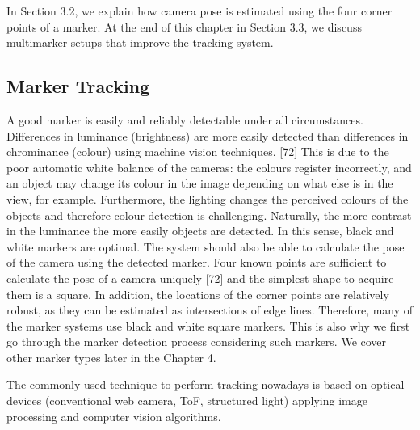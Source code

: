 In Section 3.2, we explain how camera pose is estimated using the four corner
points of a marker. At the end of this chapter in Section 3.3, we discuss multimarker
setups that improve the tracking system.

\subsection{Marker Tracking}

A good marker is easily and reliably detectable under all circumstances. Differences in luminance (brightness) are more easily detected than differences in chrominance (colour) using machine vision techniques. [72] This is due to the poor automatic white balance of the cameras: the colours register incorrectly, and an object may change its colour in the image depending on what else is in the view, for example. Furthermore, the lighting changes the perceived colours of the objects and therefore colour detection is challenging. Naturally, the more contrast in the luminance the more easily objects are detected. In this sense, black and white markers are optimal. The system should also be able to calculate the pose of the camera using the detected marker. Four known points are sufficient to calculate the pose of a camera uniquely [72] and the simplest shape to acquire them is a square. In addition, the locations of the corner points are relatively robust, as they can be estimated as intersections of edge lines. Therefore, many of the marker systems use black and white square markers. This is also why we first go through the marker detection process considering such markers. We cover other marker types later in the Chapter 4.




The commonly used technique to perform tracking nowadays is based on optical devices (conventional web camera, ToF, structured light) applying image processing and computer vision algorithms. 

